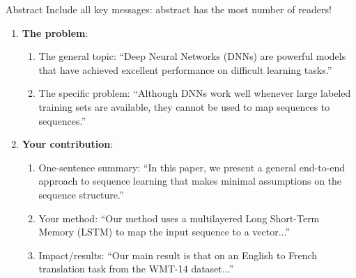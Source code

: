 \documentclass[usenames,dvipsnames,notes]{beamer}
\begin{document}
\begin{frame}
    {Abstract}
        Include all key messages: abstract has the most number of readers! \\
            \begin{enumerate}
                \item \textbf{The problem}:
                    \begin{enumerate}
                        \item The general topic: {\footnotesize``Deep Neural Networks (DNNs) are powerful models that have achieved excellent performance on difficult learning tasks.''}\\
                        \item The specific problem: {\footnotesize ``Although DNNs work well whenever large labeled training sets are available, they cannot be used to map sequences to sequences.''}
                    \end{enumerate}
                \item \textbf{Your contribution}: \\
                    \begin{enumerate}
                        \item One-sentence summary: {\footnotesize``In this paper, we present a general end-to-end approach to sequence learning that makes minimal assumptions on the sequence structure.''}\\
                        \item Your method: {\footnotesize ``Our method uses a multilayered Long Short-Term Memory (LSTM) to map the input sequence to a vector...''}\\
                        \item Impact/results: {\footnotesize ``Our main result is that on an English to French translation task from the WMT-14 dataset...''}
                    \end{enumerate}
            \end{enumerate}
\end{frame}
\end{document}
